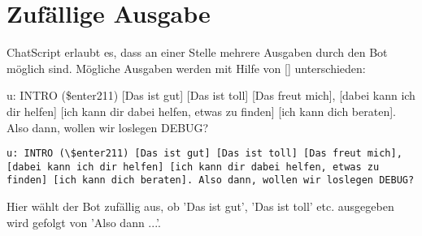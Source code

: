 \section{Zufällige Ausgabe}
\label{sec:ChatScript: Zufällige Ausgabe}

ChatScript erlaubt es, dass an einer Stelle mehrere Ausgaben durch den Bot möglich sind. Mögliche Ausgaben werden mit Hilfe von [] unterschieden:

u: INTRO (\$enter211) [Das ist gut] [Das ist toll] [Das freut mich], [dabei kann ich dir helfen] [ich kann dir dabei helfen, etwas zu finden] [ich kann dich beraten]. Also dann, wollen wir loslegen DEBUG?

\begin{lstlisting}[caption={Regel in keyexonesentence.top}]
u: INTRO (\$enter211) [Das ist gut] [Das ist toll] [Das freut mich], [dabei kann ich dir helfen] [ich kann dir dabei helfen, etwas zu finden] [ich kann dich beraten]. Also dann, wollen wir loslegen DEBUG?
\end{lstlisting}

Hier wählt der Bot zufällig aus, ob 'Das ist gut', 'Das ist toll' etc. ausgegeben wird gefolgt von 'Also dann ...'.